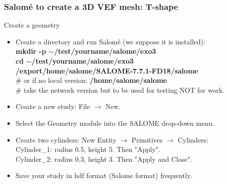 \documentclass[10pt]{beamer}
\begin{document}
\begin{frame}
\frametitle{Salom\'e to create a 3D VEF mesh: T-shape}
\begin{block}{Create a geometry}

\begin{itemize}
\item Create a directory and run Salom\'e (we suppose it is installed):\\
\textbf{mkdir -p $\sim$/test/yourname/salome/exo3} \\
\textbf{cd $\sim$/test/yourname/salome/exo3} \\

\textbf{/export/home/salome/SALOME-7.7.1-FD18/salome} \\
\# or if no local version: {\scriptsize{\textbf{/home/salome/salome}}} \\
\# take the network version but to be used for testing NOT for work.

\item Create a new study: File $\rightarrow$ New.

\item Select the Geometry module into the SALOME drop-down menu.

\item Create two cylinders: New Entity $\rightarrow$ Primitives $\rightarrow$ Cylinders:\\
Cylinder\_1: radius 0.5, height 5. Then "Apply".\\
Cylinder\_2: radius 0.3, height 3. Then "Apply and Close".
\item Save your study in hdf format (Salome format) frequently.
\end{itemize}

\end{block}
\end{frame}
\end{document}
